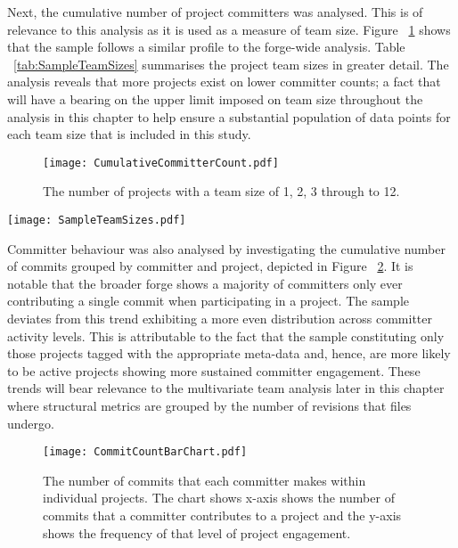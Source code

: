 Next, the cumulative number of project committers was analysed. This is of relevance to this analysis as it is used as a measure of team size. Figure ~\ref{fig:CumulativeCommitterCount} shows that the sample follows a similar profile to the forge-wide analysis. Table ~\ref{tab:SampleTeamSizes} summarises the project team sizes in greater detail. The analysis reveals that more projects exist on lower committer counts; a fact that will have a bearing on the upper limit imposed on team size throughout the analysis in this chapter to help ensure a substantial population of data points for each team size that is included in this study.

\begin{figure}[htbp!] 
\centering    
\texttt{[image: CumulativeCommitterCount.pdf]}
\caption{The number of projects with a team size of 1, 2, 3 through to 12.}
\label{fig:CumulativeCommitterCount}
\end{figure}

\begin{table}
\centering 
{}
\begin{tabular}
 \centering 
 \texttt{[image: SampleTeamSizes.pdf]}
 \label{tab:SampleTeamSizes}
\end{tabular}
\end{table}

Committer behaviour was also analysed by investigating the cumulative number of commits grouped by committer and project, depicted in Figure ~\ref{fig:CommitCountBarChart}. It is notable that the broader forge shows a majority of committers only ever contributing a single commit when participating in a project. The sample deviates from this trend exhibiting a more even distribution across committer activity levels. This is attributable to the fact that the sample constituting only those projects tagged with the appropriate meta-data and, hence, are more likely to be active projects showing more sustained committer engagement. These trends will bear relevance to the multivariate team analysis later in this chapter where structural metrics are grouped by the number of revisions that files undergo.

\begin{figure}[htbp!] 
\centering    
\texttt{[image: CommitCountBarChart.pdf]}
\caption[The number of commits that each committer makes within individual projects]{The number of commits that each committer makes within individual projects. The chart shows  x-axis shows the number of commits that a committer contributes to a project and the y-axis shows the frequency of that level of project engagement.}
\label{fig:CommitCountBarChart}
\end{figure}

